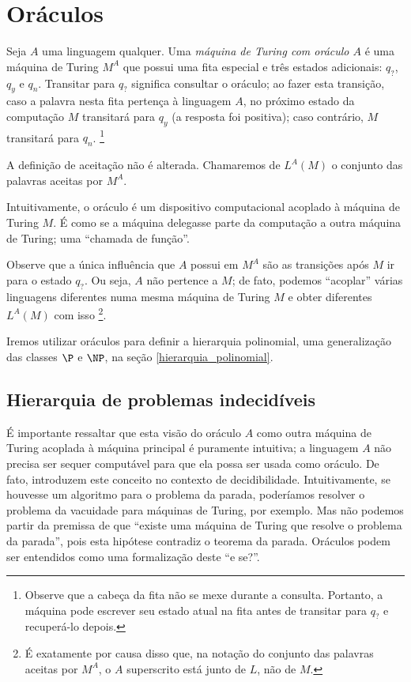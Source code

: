 \section{Oráculos}

\begin{definition}
    Seja $A$ uma linguagem qualquer.
    Uma \emph{máquina de Turing com oráculo $A$}
    é uma máquina de Turing $M^A$ que possui uma fita especial
    e três estados adicionais: $q_?$, $q_y$ e $q_n$.
    Transitar para $q_?$ significa consultar o oráculo;
    ao fazer esta transição,
    caso a palavra nesta fita pertença à linguagem $A$,
    no próximo estado da computação $M$ transitará para $q_y$
    (a resposta foi positiva);
    caso contrário, $M$ transitará para $q_n$.
    \footnote{
        Observe que a cabeça da fita não se mexe durante a consulta.
        Portanto, a máquina pode escrever seu estado atual na fita
        antes de transitar para $q_?$ e recuperá-lo depois.
    }

    A definição de aceitação não é alterada.
    Chamaremos de $L^A(M)$ o conjunto das palavras aceitas por $M^A$.
\end{definition}

Intuitivamente, o oráculo é um dispositivo computacional
acoplado à máquina de Turing $M$.
É como se a máquina delegasse parte da computação
a outra máquina de Turing;
uma ``chamada de função''.

Observe que a única influência que $A$ possui em $M^A$
são as transições após $M$ ir para o estado $q_?$.
Ou seja, $A$ não pertence a $M$;
de fato, podemos ``acoplar'' várias linguagens diferentes
numa mesma máquina de Turing $M$
e obter diferentes $L^A(M)$ com isso%
\footnote{
    É exatamente por causa disso que,
    na notação do conjunto das palavras aceitas por $M^A$,
    o $A$ superscrito está junto de $L$, não de $M$.
}.

Iremos utilizar oráculos para definir a hierarquia polinomial,
uma generalização das classes $\P$ e $\NP$,
na seção \ref{hierarquia_polinomial}.

\subsection{Hierarquia de problemas indecidíveis}

É importante ressaltar que esta visão do oráculo $A$
como outra máquina de Turing acoplada à máquina principal
é puramente intuitiva;
a linguagem $A$ não precisa ser sequer computável
para que ela possa ser usada como oráculo.
De fato, 
introduzem este conceito no contexto de decidibilidade.
Intuitivamente, se houvesse um algoritmo para o problema da parada,
poderíamos resolver o problema da vacuidade para máquinas de Turing,
por exemplo.
Mas não podemos partir da premissa de que
``existe uma máquina de Turing que resolve o problema da parada'',
pois esta hipótese contradiz o teorema da parada.
Oráculos podem ser entendidos como uma formalização deste ``e se?''.

